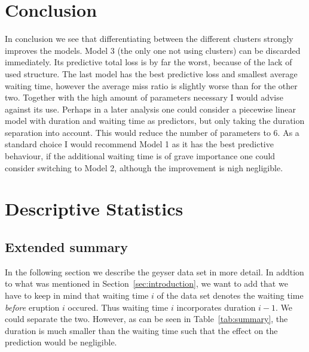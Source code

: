 \documentclass[english,final]{scrartcl}
\begin{document}
\section{Conclusion}
In conclusion we see that differentiating between the different clusters strongly improves the models. Model 3 (the only one not using clusters) can be discarded immediately. Its predictive total loss is by far the worst, because of the lack of used structure. The last model has the best predictive loss and smallest average waiting time, however the average miss ratio is slightly worse than for the other two. Together with the high amount of parameters necessary I would advise against its use. Perhaps in a later analysis one could consider a piecewise linear model with duration and waiting time as predictors, but only taking the duration separation into account. This would reduce the number of parameters to 6. As a standard choice I would recommend Model 1 as it has the best predictive behaviour, if the additional waiting time is of grave importance one could consider switching to Model 2, although the improvement is nigh negligible.

\newpage

\appendix


\section{Descriptive Statistics}
\label{sec:details}

\subsection{Extended summary}
\label{sec:summary}

In the following section we describe the geyser data set in more detail. In addtion to what was mentioned in Section~\ref{sec:introduction}, we want to add that we have to keep in mind that waiting time $i$ of the data set denotes the waiting time \emph{before} eruption $i$ occured. Thus waiting time $i$ incorporates duration $i-1$. We could separate the two. However, as can be seen in Table~\ref{tab:summary}, the duration is much smaller than the waiting time such that the effect on the prediction would be negligible.
\end{document}
